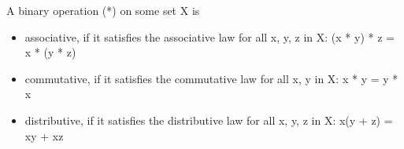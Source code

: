 A binary operation (*) on some set X is

\begin{itemize}
\item 
associative, if it satisfies the associative law for all x, y, z in X: (x * y) * z = x * (y * z)

\item 
commutative, if it satisfies the commutative law for all x, y in X: x * y = y * x

\item 
distributive, if it satisfies the distributive law for all x, y, z in X: x(y + z) = xy + xz
\end{itemize}
